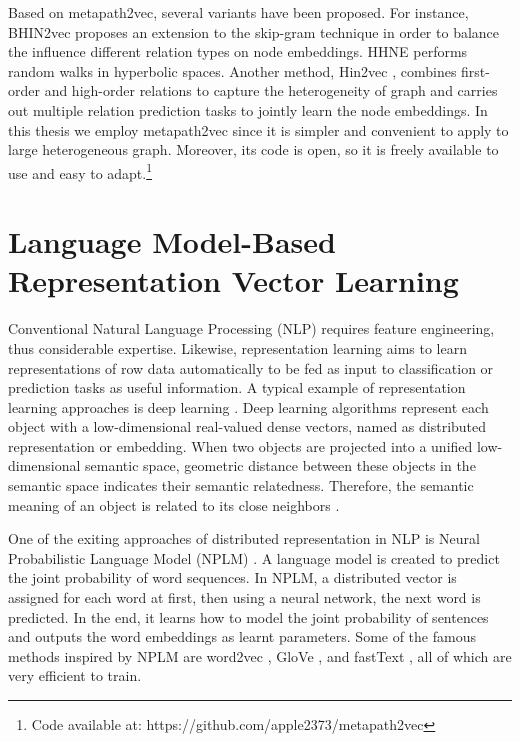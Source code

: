 Based on metapath2vec, several variants have been proposed. For instance, BHIN2vec \cite{lee2019bhin2vec} proposes an extension to the skip-gram technique in order to balance the influence different relation types on node embeddings. HHNE \cite{wang2019hyperbolic} performs random walks in hyperbolic spaces. Another method, Hin2vec \cite{fu2017hin2vec}, combines first-order and high-order relations to capture the heterogeneity of graph and carries out multiple relation prediction tasks to jointly learn the node embeddings. In this thesis we employ metapath2vec since it is simpler and convenient to apply to large heterogeneous graph. Moreover, its code is open, so it is freely available to use and easy to adapt.\footnote{Code available at: https://github.com/apple2373/metapath2vec}

\section{Language Model-Based Representation Vector Learning}
Conventional Natural Language Processing (NLP) requires feature engineering, thus considerable expertise. Likewise, representation learning aims to learn representations of row data automatically to be fed as input to classification or prediction tasks as useful information. A typical example of representation learning approaches is deep learning \cite{goodfellow2016deep}. Deep learning algorithms represent each object with a low-dimensional real-valued dense vectors, named as distributed representation or embedding. When two objects are projected into a unified low-dimensional semantic space, geometric distance between these objects in the semantic space indicates their semantic relatedness. Therefore, the semantic meaning of an object is related to its close neighbors \cite{liu2020representation}.  

One of the exiting approaches of distributed representation in NLP is Neural Probabilistic Language Model (NPLM) \cite{bengio2001neural}. A language model is created to predict the joint probability of word sequences. In NPLM, a distributed vector is assigned for each word at first, then using a neural network, the next word is predicted. In the end, it learns how to model the joint probability of sentences and outputs the word embeddings as learnt parameters. Some of the famous methods inspired by NPLM are word2vec \cite{mikolov2013distributed}, GloVe \cite{bojanowski2017enriching}, and fastText \cite{pennington2014glove}, all of which are very efficient to train. 

